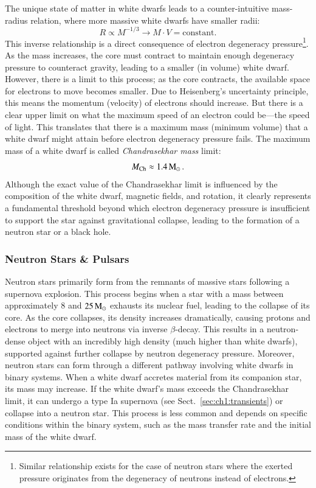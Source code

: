 \documentclass[main.tex]{subfiles}
\begin{document}
    The unique state of matter in white dwarfs leads to a counter-intuitive mass-radius relation, where more massive white dwarfs have smaller radii:
    \begin{equation}
        R \propto M^{-1/3} \longrightarrow M\cdot V = \text{constant.}
    \end{equation}
    This inverse relationship is a direct consequence of electron degeneracy pressure\footnote{Similar relationship exists for the case of neutron stars where the exerted pressure originates from the degeneracy of neutrons instead of electrons.}. As the mass increases, the core must contract to maintain enough degeneracy pressure to counteract gravity, leading to a smaller (in volume) white dwarf. However, there is a limit to this process; as the core contracts, the available space for electrons to move becomes smaller. Due to Heisenberg's uncertainty principle, this means the momentum (velocity) of electrons should increase. But there is a clear upper limit on what the maximum speed of an electron could be---the speed of light. This translates that there is a maximum mass (minimum volume) that a white dwarf might attain before electron degeneracy pressure fails. The maximum mass of a white dwarf is called \textit{Chandrasekhar mass} limit:
    \begin{equation}\label{eq:chandra_limit}
        M_\mathrm{Ch} \approx 1.4\mathrm{\,M_\odot}\,.
    \end{equation}
    Although the exact value of the Chandrasekhar limit is influenced by the composition of the white dwarf, magnetic fields, and rotation, it clearly represents a fundamental threshold beyond which electron degeneracy pressure is insufficient to support the star against gravitational collapse, leading to the formation of a neutron star or a black hole.


    \subsubsection{Neutron Stars \& Pulsars}
    Neutron stars primarily form from the remnants of massive stars following a supernova explosion. This process begins when a star with a mass between approximately $8$ and $25\mathrm{\,M_\odot}$ exhausts its nuclear fuel, leading to the collapse of its core. As the core collapses, its density increases dramatically, causing protons and electrons to merge into neutrons via inverse $\beta$-decay. This results in a neutron-dense object with an incredibly high density (much higher than white dwarfs), supported against further collapse by neutron degeneracy pressure. 
    Moreover, neutron stars can form through a different pathway involving white dwarfs in binary systems. When a white dwarf accretes material from its companion star, its mass may increase. If the white dwarf's mass exceeds the Chandrasekhar limit, it can undergo a type Ia supernova (see Sect.~\ref{sec:ch1:transients}) or collapse into a neutron star. This process is less common and depends on specific conditions within the binary system, such as the mass transfer rate and the initial mass of the white dwarf.
\end{document}
